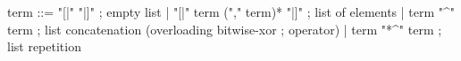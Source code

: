 \begin{syntax}
  term ::=  { "[|" "|]" } ; empty list
       | { "[|" term ("," term)* "|]" } ; list of elements
       | { term "^" term } ; list concatenation (overloading bitwise-xor 
                         ; operator)
       | { term "*^" term } ; list repetition
\end{syntax}
